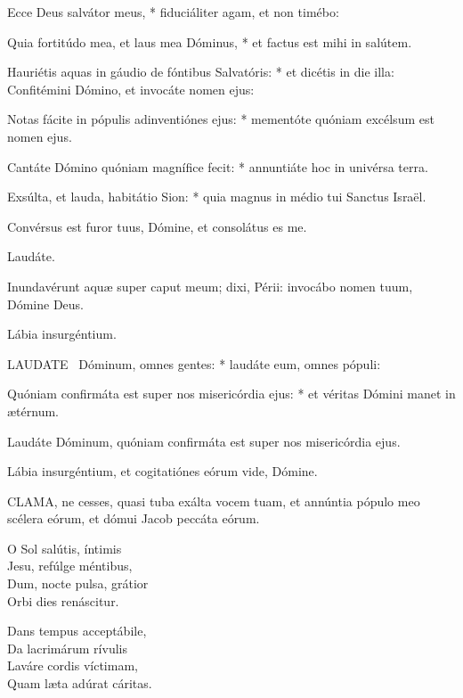 Ecce Deus salvátor meus, * fiduciáliter agam, et non timébo:

Quia fortitúdo mea, et laus mea Dóminus, * et factus est mihi in salútem.

Hauriétis aquas in gáudio de fóntibus Salvatóris: * et dicétis in die illa: Confitémini Dómino, et invocáte nomen ejus:

Notas fácite in pópulis adinventiónes ejus: * mementóte quóniam excélsum est nomen ejus.

Cantáte Dómino quóniam magnífice fecit: * annuntiáte hoc in univérsa terra.

Exsúlta, et lauda, habitátio Sion: * quia magnus in médio tui Sanctus Israël.

 Convérsus est furor tuus, Dómine, et consolátus es me.

 Laudáte. \textdagger


 Inundavérunt aquæ super caput meum; dixi, Périi: invocábo nomen tuum, Dómine Deus.

 Lábia insurgéntium.


\lettrine[lines=2]{L}{AUDATE} \textdagger\ Dóminum, omnes gentes: * laudáte eum, omnes pópuli:

Quóniam confirmáta est super nos misericórdia ejus: * et véritas Dómini manet in ætérnum.

 Laudáte Dóminum, quóniam confirmáta est super nos misericórdia ejus.


 Lábia insurgéntium, et cogitatiónes eórum vide, Dómine.



\lettrine[lines=2]{C}{LAMA}, ne cesses, quasi tuba exálta vocem tuam, et annúntia pópulo meo scélera eórum, et dómui Jacob peccáta eórum.


\lettrine[lines=2]{O}{} Sol salútis, íntimis\\
Jesu, refúlge méntibus,\\
Dum, nocte pulsa, grátior\\
Orbi dies renáscitur.

Dans tempus acceptábile,\\
Da lacrimárum rívulis\\
Laváre cordis víctimam,\\
Quam læta adúrat cáritas.

